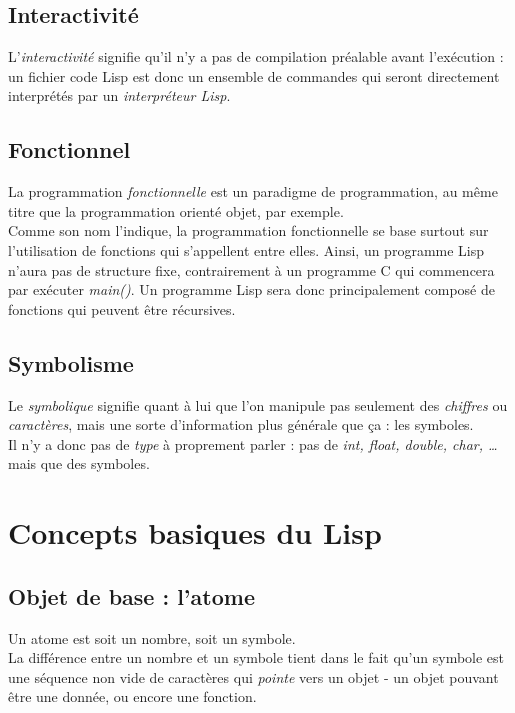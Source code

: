 \documentclass{report}
\begin{document}
\subsection{Interactivité}
L'\emph{interactivité} signifie qu'il n'y a pas de compilation préalable avant l'exécution : un fichier code Lisp est donc un ensemble de commandes qui seront directement interprétés par un \emph{interpréteur Lisp}.
\subsection{Fonctionnel}
La programmation \emph{fonctionnelle} est un paradigme de programmation, au même titre que la programmation orienté objet, par exemple.\\
Comme son nom l'indique, la programmation fonctionnelle se base surtout sur l'utilisation de fonctions qui s'appellent entre elles.
Ainsi, un programme Lisp n'aura pas de structure fixe, contrairement à un programme C qui commencera par exécuter \emph{main()}.
Un programme Lisp sera donc principalement composé de fonctions qui peuvent être récursives.
\par
\subsection{Symbolisme}
Le \emph{symbolique} signifie quant à lui que l'on manipule pas seulement des \emph{chiffres} ou \emph{caractères}, mais une sorte d'information plus générale que ça : les symboles.\\
Il n'y a donc pas de \emph{type} à proprement parler : pas de \emph{int, float, double, char, \ldots} mais que des symboles.

\section{Concepts basiques du Lisp}
\subsection{Objet de base : l'atome}
Un atome est soit un nombre, soit un symbole.\\
La différence entre un nombre et un symbole tient dans le fait qu'un symbole est une séquence non vide de caractères qui \emph{pointe} vers un objet - un objet pouvant être une donnée, ou encore une fonction.\\
\end{document}
